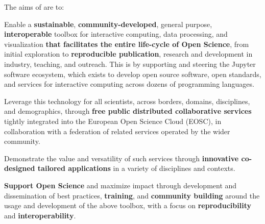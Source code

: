 \medskip
\noindent The aims of \TheProject are to:

\begin{compactenum}
\item Enable a
  \textbf{sustainable}, \textbf{community-developed}, general purpose, \textbf{interoperable} toolbox for
  interactive computing, data processing, and visualization
  \textbf{that facilitates the entire life-cycle of Open Science},
  from initial exploration to \textbf{reproducible publication}, research and development in
  industry, teaching, and outreach.
  This is by supporting and steering the Jupyter software ecosystem,
  which exists to develop open source software,
  open standards, and services for interactive computing across dozens of programming languages.

\item Leverage this technology for all scientists, across borders,
  domains, disciplines, and demographics, through
  \textbf{free public distributed collaborative services} tightly integrated
  into the European Open Science Cloud (EOSC),
  in collaboration with a federation of related services
  operated by the wider community.

\item Demonstrate the value and versatility of such services through
  \textbf{innovative co-designed tailored applications} in a variety of disciplines and
  contexts.

\item \textbf{Support Open Science} and maximize impact through development and
  dissemination of best practices,
  \textbf{training}, and \textbf{community building}
  around the usage and development of the above toolbox,
  with a focus on \textbf{reproducibility} and
  \textbf{interoperability}.
\end{compactenum}



